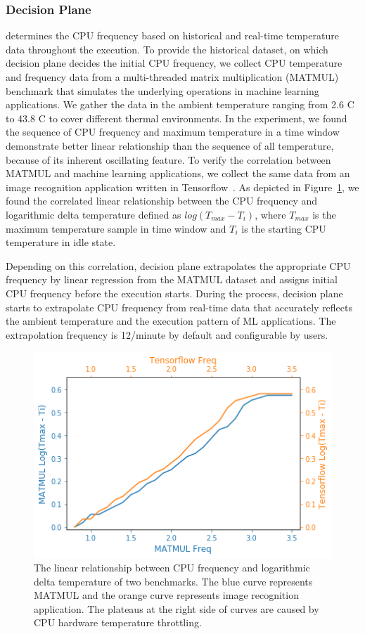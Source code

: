 \subsubsection{Decision Plane}
 determines the CPU frequency based on historical and real-time temperature data throughout the execution. To provide the historical dataset, on which decision plane decides the initial CPU frequency, we collect CPU temperature and frequency data from a multi-threaded matrix multiplication (MATMUL) benchmark that simulates the underlying operations in machine learning applications. We gather the data in the ambient temperature ranging from 2.6 \degree C to 43.8 \degree C to cover different thermal environments. In the experiment, we found the sequence of CPU frequency and maximum temperature in a time window demonstrate better linear relationship than the sequence of all temperature, because of its inherent oscillating feature. To verify the correlation between MATMUL and machine learning applications, we collect the same data from an image recognition application written in Tensorflow~\cite{ref:tensorflow}. As depicted in Figure~\ref{fig:mat-vs-tf}, we found the correlated linear relationship between the CPU frequency and logarithmic delta temperature defined as $log(T_{max} - T_i)$, where $T_{max}$ is the maximum temperature sample in time window and $T_i$ is the starting CPU temperature in idle state. 
 
 Depending on this correlation, decision plane extrapolates the appropriate CPU frequency by linear regression from the MATMUL dataset and assigns initial CPU frequency before the execution starts. During the process, decision plane starts to extrapolate CPU frequency from real-time data that accurately reflects the ambient temperature and the execution pattern of ML applications. The extrapolation frequency is 12/minute by default and configurable by users.

\begin{figure}[h!]
\centering
\includegraphics[scale=0.5]{figures/matmul-tensorflow.png}
\caption{The linear relationship between CPU frequency and logarithmic delta temperature of two benchmarks. The blue curve represents MATMUL and the orange curve represents image recognition application. The plateaus at the right side of curves are caused by CPU hardware temperature throttling. } \label{fig:mat-vs-tf}
\end{figure}


